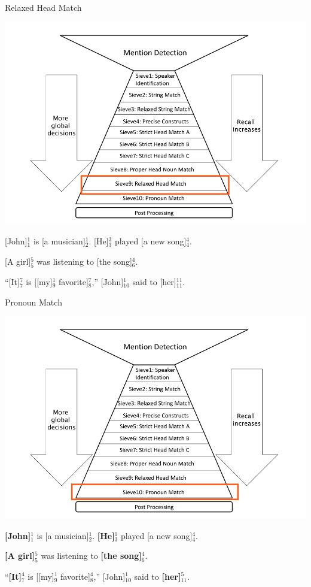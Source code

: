 \documentclass[11pt,a4paper]{beamer}
\begin{document}
\begin{frame}{Relaxed Head Match}

\includegraphics[scale=0.15]{sieve9.png} 
\bigskip

[John]$^{1}_{1}$ is [a musician]$^{1}_{2}$. [He]$^{3}_{3}$ played [a new song]$^{4}_{4}$.

[A girl]$^{5}_{5}$ was listening to [the song]$^{4}_{6}$.

“[It]$^{7}_{7}$ is [[my]$^{1}_{9}$ favorite]$^{7}_{8}$,” [John]$^{1}_{10}$ said to [her]$^{11}_{11}$.

\end{frame}

\begin{frame}{Pronoun Match}

\includegraphics[scale=0.15]{sieve10.png} 
\bigskip

\textbf{[John]}$^{1}_{1}$ is [a musician]$^{1}_{2}$. \textbf{[He]}$^{1}_{3}$ played [a new song]$^{4}_{4}$.

\textbf{[A girl]}$^{5}_{5}$ was listening to \textbf{[the song]}$^{4}_{6}$.

“\textbf{[It]}$^{4}_{7}$ is [[my]$^{1}_{9}$ favorite]$^{4}_{8}$,” [John]$^{1}_{10}$ said to \textbf{[her]}$^{5}_{11}$.

\end{frame}
\end{document}
